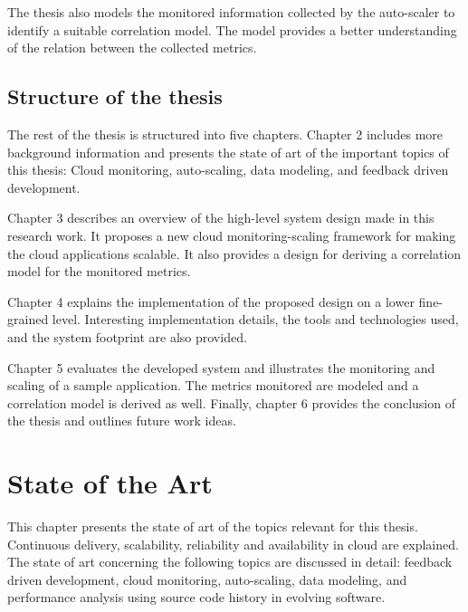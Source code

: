\documentclass[article,type=msc,colorback,12pt,accentcolor=tud8b,table]{tudthesis}
\begin{document}
	The thesis also models the monitored information collected by the auto-scaler to identify a suitable correlation model. The model provides a better understanding of the relation between the collected metrics. 
	
	\subsection{Structure of the thesis}

	\par The rest of the thesis is structured into five chapters.  Chapter 2 includes more background information and presents the state of art of the important topics of this thesis: Cloud monitoring, auto-scaling, data modeling, and feedback driven development. 
	
	Chapter 3 describes an overview of the high-level system design made in this research work. It proposes a new cloud monitoring-scaling framework for making the cloud applications scalable. It also provides a design for deriving a correlation model for the monitored metrics.
	
	Chapter 4 explains the implementation of the proposed design on a lower fine-grained level. Interesting implementation details, the tools and technologies used,  and the system footprint are also provided.  
	
	Chapter 5 evaluates the developed system and illustrates the monitoring and scaling of a sample application. The metrics monitored are modeled and a correlation model is derived as well. Finally, chapter 6 provides the conclusion of the thesis and outlines future work ideas.


	\cleardoublepage
 
 \hfill 
 \section{State of the Art}
  \hfill \break
 	
	This chapter presents the state of art of the topics relevant for this thesis. Continuous delivery, scalability, reliability and availability in cloud are explained. The state of art concerning the following topics are discussed in detail: feedback driven development, cloud monitoring, auto-scaling, data modeling, and performance analysis using source code history in evolving software.
	
\end{document}

